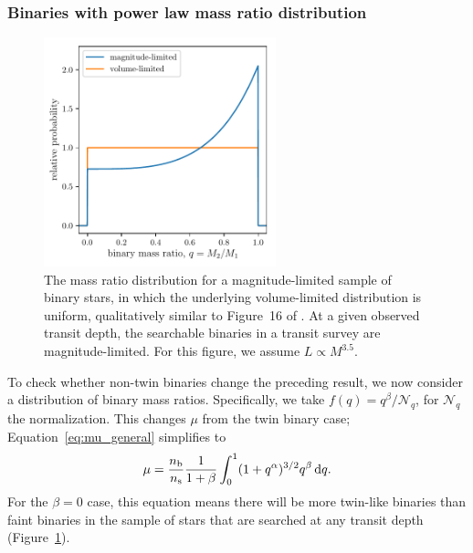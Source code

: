 \documentclass[12pt,modern]{aastex61}
\newcommand{\s}{_{\rm s}}
\renewcommand{\b}{_{\rm b}}
\begin{document}
\subsubsection{Binaries with power law mass ratio distribution}
\label{sub:powerlaw_varying_binaries}

\begin{figure}[!tb]
    \centering
    \includegraphics[width=0.6\textwidth]{figures/mass_ratio_distribution.pdf}
    \caption{
        The mass ratio distribution for a magnitude-limited sample of
        binary stars, in which the underlying volume-limited
        distribution is uniform, qualitatively similar to Figure~16 of
        \citet{raghavan_survey_2010}.  At a given observed transit
        depth, the searchable binaries in a transit survey are
        magnitude-limited. For this figure, we assume $L\propto
        M^{3.5}$.
    }
    \label{fig:q_distribn_mag_limited}
\end{figure}

To check whether non-twin binaries change the preceding result, we now
consider a distribution of binary mass ratios.  Specifically, we take
$f(q) = q^\beta/\mathcal{N}_q$, for $\mathcal{N}_q$ the normalization.
This changes $\mu$ from the twin binary case;
Equation~\ref{eq:mu_general} simplifies to
\begin{equation}
    \mu = \frac{n\b}{n\s} \frac{1}{1+\beta}
    \int_0^1 (1+q^\alpha)^{3/2}q^\beta\,{\rm d}q.
    \label{eq:mu_power_law_q}
\end{equation}
For the $\beta=0$ case, this equation means there will be more
twin-like binaries than faint binaries in the sample of stars
that are searched at any transit depth
(Figure~\ref{fig:q_distribn_mag_limited}). 
\end{document}
